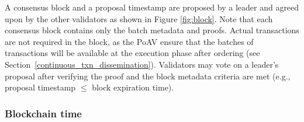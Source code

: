 \documentclass{article}
\begin{document}
A consensus block and a proposal timestamp are proposed by a leader and agreed upon by the other validators as shown in Figure \ref{fig:block}. Note that each consensus block contains only the batch metadata and proofs. Actual transactions are not required in the block, as the PoAV ensure that the batches of transactions will be available at the execution phase after ordering (see Section~\ref{continuous_txn_dissemination}). Validators may vote on a leader's proposal after verifying the proof and the block metadata criteria are met (e.g., proposal timestamp $\le$ block expiration time).

\subsubsection{Blockchain time}
\label{subsubsec:blockchain_time}
\end{document}
